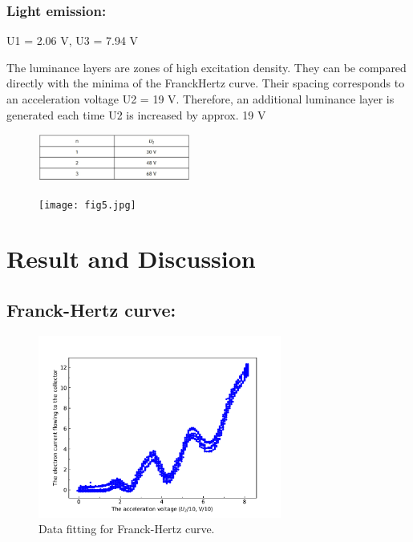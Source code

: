 \documentclass[a4paper, 10pt, nanum]{CSUniSchoolLabReport}
\begin{document}
\subsubsection{Light emission:}
	U1 = 2.06 V, U3 = 7.94 V 

	The luminance layers are zones of high excitation density. They can be compared directly with the minima of the FranckHertz curve. Their spacing corresponds to an acceleration voltage U2 = 19 V. Therefore, an additional luminance layer is generated each time U2 is increased by approx. 19 V 

	\begin{figure}[htb!]
		\centering
		\includegraphics[width=5cm]{fig4.png}
		\caption{}
		\label{fig:4}
	\end{figure}

	\begin{figure}[htb!]
		\centering
		\texttt{[image: fig5.jpg]}
		\caption{}
		\label{fig:5}
	\end{figure}


\section{Result and Discussion}

\subsection{Franck-Hertz curve:}
	\begin{figure}[htb!]
		\centering
		\includegraphics[width=8cm]{fig6.pdf}
		\caption{Data fitting for Franck-Hertz curve.}
		\label{fig:6}
	\end{figure}
\end{document}
